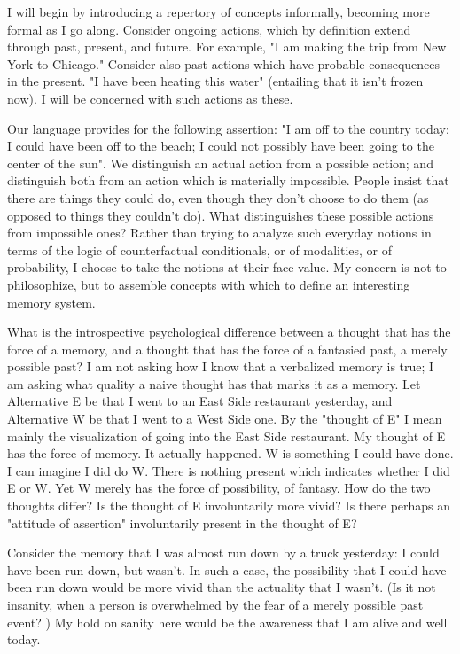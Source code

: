 \documentclass[10pt,twoside]{memoir}
\begin{document}
\begin{enumerate}
{\begin{enumerate}
\begin{sysrules}
\begin{sysrules}
\begin{sysrules}
\begin{sysrules}
I will begin by introducing a repertory of concepts informally, 
becoming more formal as I go along. Consider ongoing actions, which by 
definition extend through past, present, and future. For example, "I am 
making the trip from New York to Chicago." Consider also past actions 
which have probable consequences in the present. "I have been heating this 
water" (entailing that it isn't frozen now). I will be concerned with such 
actions as these. 

Our language provides for the following assertion: "I am off to the 
country today; I could have been off to the beach; I could not possibly have 
been going to the center of the sun". We distinguish an actual action from a 
possible action; and distinguish both from an action which is materially 
impossible. People insist that there are things they could do, even though 
they don't choose to do them (as opposed to things they couldn't do). What 
distinguishes these possible actions from impossible ones? Rather than 
trying to analyze such everyday notions in terms of the logic of 
counterfactual conditionals, or of modalities, or of probability, I choose to 
take the notions at their face value. My concern is not to philosophize, but 
to assemble concepts with which to define an interesting memory system. 

What is the introspective psychological difference between a thought 
that has the force of a memory, and a thought that has the force of a 
fantasied past, a merely possible past? I am not asking how I know that a 
verbalized memory is true; I am asking what quality a naive thought has that 
marks it as a memory. Let Alternative E be that I went to an East Side 
restaurant yesterday, and Alternative W be that I went to a West Side one. 
By the "thought of E" I mean mainly the visualization of going into the East 
Side restaurant. My thought of E has the force of memory. It actually 
happened. W is something I could have done. I can imagine I did do W. There 
is nothing present which indicates whether I did E or W. Yet W merely has 
the force of possibility, of fantasy. How do the two thoughts differ? Is the 
thought of E involuntarily more vivid? Is there perhaps an "attitude of 
assertion" involuntarily present in the thought of E? 

Consider the memory that I was almost run down by a truck yesterday: 
I could have been run down, but wasn't. In such a case, the possibility that I 
could have been run down would be more vivid than the actuality that I 
wasn't. (Is it not insanity, when a person is overwhelmed by the fear of a 
merely possible past event? ) My hold on sanity here would be the awareness 
that I am alive and well today. 


\end{sysrules}
\end{sysrules}
\end{sysrules}
\end{sysrules}
\end{enumerate}}
\end{enumerate}
\end{document}
